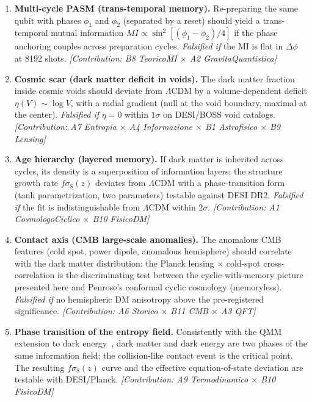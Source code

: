 ﻿\documentclass[12pt,a4paper]{article}
\begin{document}
\begin{enumerate}
    \item \textbf{Multi-cycle PASM (trans-temporal memory).} Re-preparing the same qubit with phases $\phi_1$ and $\phi_2$ (separated by a reset) should yield a trans-temporal mutual information $MI \propto \sin^2[(\phi_1-\phi_2)/4]$ if the phase anchoring couples across preparation cycles. \textit{Falsified if} the MI is flat in $\Delta\phi$ at 8192 shots. \textit{[Contribution: B8 TeoricoMI $\times$ A2 GravitaQuantistica]}
    \item \textbf{Cosmic scar (dark matter deficit in voids).} The dark matter fraction inside cosmic voids should deviate from $\Lambda$CDM by a volume-dependent deficit $\eta(V) \sim \log V$, with a radial gradient (null at the void boundary, maximal at the center). \textit{Falsified if} $\eta = 0$ within $1\sigma$ on DESI/BOSS void catalogs. \textit{[Contribution: A7 Entropia $\times$ A4 Informazione $\times$ B1 Astrofisico $\times$ B9 Lensing]}
    \item \textbf{Age hierarchy (layered memory).} If dark matter is inherited across cycles, its density is a superposition of information layers; the structure growth rate $f\sigma_8(z)$ deviates from $\Lambda$CDM with a phase-transition form (tanh parametrization, two parameters) testable against DESI DR2. \textit{Falsified if} the fit is indistinguishable from $\Lambda$CDM within $2\sigma$. \textit{[Contribution: A1 CosmologoCiclico $\times$ B10 FisicoDM]}
    \item \textbf{Contact axis (CMB large-scale anomalies).} The anomalous CMB features (cold spot, power dipole, anomalous hemisphere) should correlate with the dark matter distribution: the Planck lensing $\times$ cold-spot cross-correlation is the discriminating test between the cyclic-with-memory picture presented here and Penrose's conformal cyclic cosmology (memoryless). \textit{Falsified if} no hemispheric DM anisotropy above the pre-registered significance. \textit{[Contribution: A6 Storico $\times$ B11 CMB $\times$ A3 QFT]}
    \item \textbf{Phase transition of the entropy field.} Consistently with the QMM extension to dark energy~\cite{neukart2025de}, dark matter and dark energy are two phases of the same information field; the collision-like contact event is the critical point. The resulting $f\sigma_8(z)$ curve and the effective equation-of-state deviation are testable with DESI/Planck. \textit{[Contribution: A9 Termodinamico $\times$ B10 FisicoDM]}
\end{enumerate}
\end{document}

